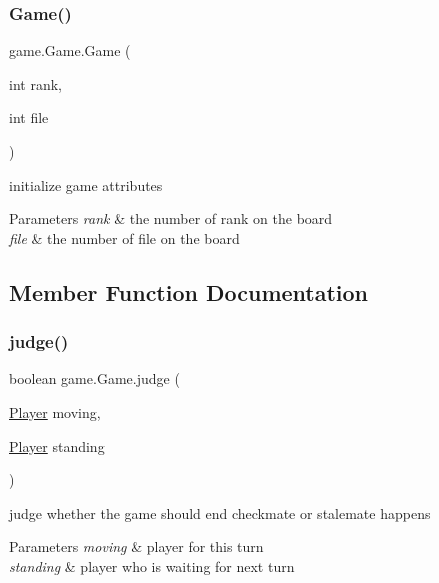\subsubsection{\texorpdfstring{Game()}{Game()}}
{\footnotesize\ttfamily game.\+Game.\+Game (\begin{DoxyParamCaption}\item[{int}]{rank,  }\item[{int}]{file }\end{DoxyParamCaption})\hspace{0.3cm}{\ttfamily [inline]}}

initialize game attributes 
\begin{DoxyParams}{Parameters}
{\em rank} & the number of rank on the board \\
\hline
{\em file} & the number of file on the board \\
\hline
\end{DoxyParams}


\subsection{Member Function Documentation}
\mbox{\label{classgame_1_1_game_a4020b63689c4aaaa1b67dc458ff2fbee}} 
\subsubsection{\texorpdfstring{judge()}{judge()}}
{\footnotesize\ttfamily boolean game.\+Game.\+judge (\begin{DoxyParamCaption}\item[{\mbox{\hyperlink{classgame_1_1_player}{Player}}}]{moving,  }\item[{\mbox{\hyperlink{classgame_1_1_player}{Player}}}]{standing }\end{DoxyParamCaption})\hspace{0.3cm}{\ttfamily [inline]}}

judge whether the game should end checkmate or stalemate happens 
\begin{DoxyParams}{Parameters}
{\em moving} & player for this turn \\
\hline
{\em standing} & player who is waiting for next turn \\
\hline
\end{DoxyParams}
\mbox{\label{classgame_1_1_game_a7f87abb7baa5fa13ac53da8f534f79bd}} 
